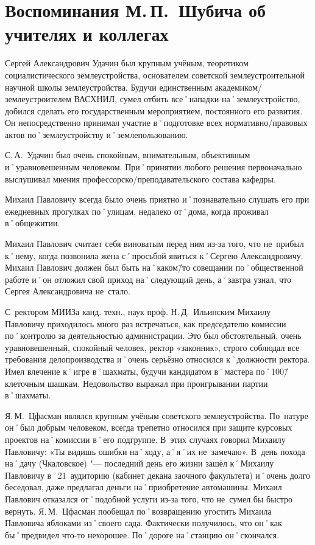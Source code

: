 ﻿\chapter[Воспоминания об учителях и коллегах]{Воспоминания М.\,П.~Шубича об учителях и коллегах}


Сергей Александрович Удачин был крупным учёным, теоретиком социалистического землеустройства, основателем советской землеустроительной научной школы землеустройства. Будучи единственным академиком\-/землеустроителем ВАСХНИЛ, сумел отбить все˚нападки на˚землеустройство, добился сделать его государственным мероприятием, постоянного его развития. Он непосредственно принимал участие в˚подготовке всех нормативно\-/правовых актов по˚землеустройству и˚землепользованию. 

С.\,А.~Удачин был очень спокойным, внимательным, объективным и˚уравновешенным человеком. При˚принятии любого решения первоначально выслушивал мнения профессорско\-/преподавательского состава кафедры. 

Михаил Павловичу всегда было очень приятно и˚познавательно слушать его при ежедневных прогулках по˚улицам, недалеко от˚дома, когда проживал в˚общежитии.

Михаил Павлович считает себя виноватым перед ним из-за того, что не~прибыл к˚нему, когда позвонила жена с˚просьбой явиться к˚Сергею Александровичу. Михаил Павлович должен был быть на˚каком\=/то совещании по˚общественной работе и˚он отложил свой приход на˚следующий день, а˚завтра узнал, что Сергея Александровича не~стало.

С~ректором МИИЗа канд. техн., наук проф. Н.\,Д.~Ильинским Михаилу Павловичу приходилось много раз встречаться, как председателю комиссии по˚контролю за  деятельностью администрации. Это был обстоятельный, очень уравновешенный, спокойный человек, ректор «законник», строго соблюдал все требования делопроизводства и˚очень серьёзно относился к˚должности ректора. Имел влечение к˚игре в˚шахматы, будучи кандидатом в˚мастера по˚100\=/клеточным шашкам. Недовольство выражал при проигрывании партии в˚шахматы.

Я.\,М.~Цфасман являлся крупным учёным советского землеустройства. По~натуре он˚был добрым человеком, всегда трепетно относился при защите курсовых проектов на˚комиссии в˚его подгруппе. В~этих случаях говорил Михаилу Павловичу: «Ты видишь ошибки на˚ходу, а˚я˚их не~замечаю». В~день похода на˚дачу (Чкаловское) "--- последний день его жизни зашёл к˚Михаилу Павловичу в˚21~аудиторию (кабинет декана заочного факультета) и˚очень долго беседовал, даже предлагал деньги на˚приобретение автомашины. Михаил Павлович отказался от˚подобной услуги из-за того, что не~сумел бы быстро вернуть. Я.\,М.~Цфасман пообещал по˚возвращению угостить Михаила Павловича яблоками из˚своего сада. Фактически получилось, что он˚как бы˚предвидел что-то нехорошее. По˚дороге на˚станцию он˚скончался.

